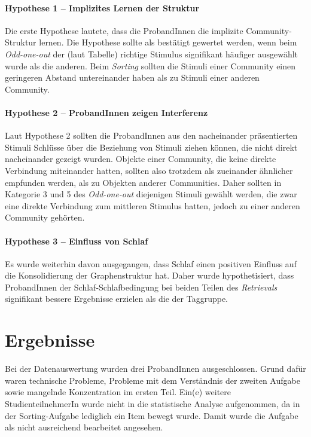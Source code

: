 \paragraph{Hypothese 1 – Implizites Lernen der Struktur}
Die erste Hypothese lautete, dass die ProbandInnen die implizite Community-Struktur lernen.
Die Hypothese sollte als bestätigt gewertet werden, wenn beim \textit{Odd-one-out} der (laut Tabelle) richtige Stimulus signifikant häufiger ausgewählt wurde als die anderen. Beim \textit{Sorting} sollten die Stimuli einer Community einen geringeren Abstand untereinander haben als zu Stimuli einer anderen Community.

\paragraph{Hypothese 2 – ProbandInnen zeigen Interferenz}
Laut Hypothese 2 sollten die ProbandInnen aus den nacheinander präsentierten Stimuli Schlüsse über die Beziehung von Stimuli ziehen können, die nicht direkt nacheinander gezeigt wurden. Objekte einer Community, die keine direkte Verbindung miteinander hatten, sollten also trotzdem als zueinander ähnlicher empfunden werden, als zu Objekten anderer Communities.
Daher sollten in Kategorie 3 und 5 des \textit{Odd-one-out} diejenigen Stimuli gewählt werden, die zwar eine direkte Verbindung zum mittleren Stimulus hatten, jedoch zu einer anderen Community gehörten.

\paragraph{Hypothese 3 – Einfluss von Schlaf}
Es wurde weiterhin davon ausgegangen, dass Schlaf einen positiven Einfluss auf die Konsolidierung der Graphenstruktur hat. Daher wurde hypothetisiert, dass ProbandInnen der Schlaf-Schlafbedingung bei beiden Teilen des \textit{Retrievals} signifikant bessere Ergebnisse erzielen als die der Taggruppe.

\section{Ergebnisse}
\label{S:3}
Bei der Datenauswertung wurden drei ProbandInnen ausgeschlossen. Grund dafür waren technische Probleme, Probleme mit dem Verständnis der zweiten Aufgabe sowie mangelnde Konzentration im ersten Teil.
Ein(e) weitere StudienteilnehmerIn wurde nicht in die statistische Analyse aufgenommen, da in der Sorting-Aufgabe lediglich ein Item bewegt wurde. Damit wurde die Aufgabe als nicht ausreichend bearbeitet angesehen.

